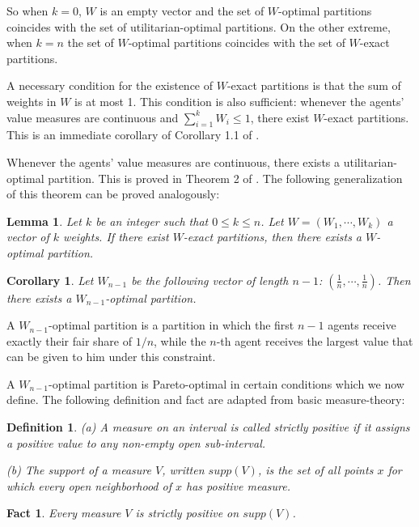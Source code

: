 \documentclass[a4paper,12pt]{article}
\newtheorem{lemma}{Lemma}[section]
\newtheorem{cor}{Corollary}[section]
\newtheorem{fact}{Fact}[section]
\newtheorem{defn}{Definition}[section]
\begin{document}
So when $k=0$, $W$ is an empty vector and the set of $W$-optimal partitions coincides with the set of utilitarian-optimal partitions. On the other extreme, when $k=n$ the set of $W$-optimal partitions coincides with the set of $W$-exact partitions.

A necessary condition for the existence of $W$-exact partitions is that the sum of weights in $W$ is at most 1. This condition is also sufficient: whenever the agents' value measures are continuous and $\sum_{i=1}^{k}{W_i}\leq 1$, there exist $W$-exact partitions. This is an immediate corollary of Corollary 1.1 of \cite{Dubins_1961}.

Whenever the agents' value measures are continuous, there exists a utilitarian-optimal partition. This is proved in Theorem 2 of \cite{Dubins_1961}. The following generalization of this theorem can be proved analogously:

\begin{lemma}
Let $k$ be an integer such that $0\leq k\leq n$. Let $W=(W_1,\cdots,W_k)$ a vector of $k$ weights. If there exist $W$-exact partitions, then there exists a $W$-optimal partition.
\end{lemma}

\begin{cor}
Let $W_{n-1}$ be the following vector of length $n-1$: $(\frac{1}{n},\cdots,\frac{1}{n})$. Then there exists a $W_{n-1}$-optimal partition.
\end{cor}

A $W_{n-1}$-optimal partition is a partition in which the first $n-1$ agents receive exactly their fair share of $1/n$, while the $n$-th agent receives the largest value that can be given to him under this constraint.

A $W_{n-1}$-optimal partition is Pareto-optimal in certain conditions which we now define. The following definition and fact are adapted from basic measure-theory:

\begin{defn}
(a) A measure on an interval is called \emph{strictly positive} if it assigns a positive value to any non-empty open sub-interval.

(b) The \emph{support} of a measure $V$, written $supp(V)$, is the set of all points $x$ for which every open neighborhood of $x$ has positive measure.
\end{defn}

\begin{fact}
Every measure $V$ is strictly positive on $supp(V)$.
\end{fact}
\end{document}
